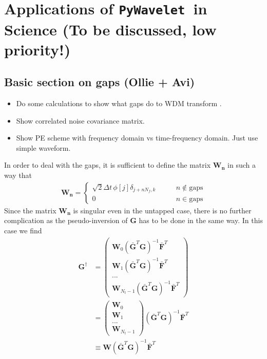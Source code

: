 \documentclass[%
 reprint,
superscriptaddress,
nofootinbib,
 amsmath,amssymb,
 aps,
colorlinks = true, 
linkcolor = blue, 
urlcolor = blue, 
citecolor = blue, 
anchorcolor = blue,
]{revtex4-2}
\newcommand{\package}{\texttt{PyWavelet}}
\begin{document}
\section{Applications of \package\ in Science (To be discussed, low priority!)}
\subsection{Basic section on gaps (Ollie + Avi)}
\begin{itemize}
\item Do some calculations to show what gaps do to WDM transform . 
\item Show correlated noise covariance matrix.
\item Show PE scheme with frequency domain vs time-frequency domain. Just use simple waveform. 
\end{itemize}

In order to deal with the gaps, it is sufficient to define the matrix $\mathbf{W_n}$ in such a way that
%
\begin{align}
\mathbf{W_n}=\begin{cases}
    \sqrt{2} \Delta t  \,\phi[j]\delta_{j+nN_f,k}&\qquad n\notin \text{gaps}\\
    0 &\qquad n\in \text{gaps}
\end{cases}
\end{align}
%
Since the matrix $\mathbf{W_n}$ is singular even in the untapped case, there is no further complication as the pseudo-inversion of $\mathbf{G}$ has to be done in the same way. In this case we find
%
\begin{align}
\mathbf{G}^\dagger&= \begin{pmatrix} \mathbf{W}_0\left(\bar{\mathbf{G}}^T\mathbf{G}\right)^{-1}\bar{\mathbf{F}}^T\\ \mathbf{W}_1\left(\bar{\mathbf{G}}^T\mathbf{G}\right)^{-1}\bar{\mathbf{F}}^T\\...\\ \mathbf{W}_{N_t-1}\left(\bar{\mathbf{G}}^T\mathbf{G}\right)^{-1}\bar{\mathbf{F}}^T
\end{pmatrix} \\ &=\begin{pmatrix} \mathbf{W}_0\\ \mathbf{W}_1\\...\\ \mathbf{W}_{N_t-1}
\end{pmatrix}\left(\bar{\mathbf{G}}^T\mathbf{G}\right)^{-1}\bar{\mathbf{F}}^T \\&\equiv\mathbf{W}\left(\bar{\mathbf{G}}^T\mathbf{G}\right)^{-1}\bar{\mathbf{F}}^T
\end{align}
%
\end{document}
